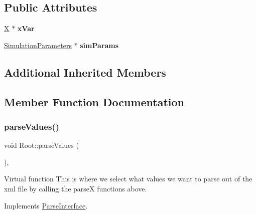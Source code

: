 \subsection*{Public Attributes}
\begin{DoxyCompactItemize}
\item 
\mbox{\label{classRoot_aa61fa8f78e32674c07681894d1dd3a12}} 
\hyperlink{classX}{X} $\ast$ {\bfseries x\+Var}
\item 
\mbox{\label{classRoot_a9234ed2debae0233778343218393f9b2}} 
\hyperlink{classSimulationParameters}{Simulation\+Parameters} $\ast$ {\bfseries sim\+Params}
\end{DoxyCompactItemize}
\subsection*{Additional Inherited Members}


\subsection{Member Function Documentation}
\mbox{\label{classRoot_ade0eb65da55fa8c045a76bcf1fb16009}} 
\subsubsection{\texorpdfstring{parse\+Values()}{parseValues()}\hspace{0.1cm}{\footnotesize\ttfamily [1/2]}}
{\footnotesize\ttfamily void Root\+::parse\+Values (\begin{DoxyParamCaption}{ }\end{DoxyParamCaption})\hspace{0.3cm}{\ttfamily [inline]}, {\ttfamily [virtual]}}

Virtual function This is where we select what values we want to parse out of the xml file by calling the parseX functions above. 

Implements \hyperlink{classParseInterface_afca32108192ba0997c9e5a78189b0cbc}{Parse\+Interface}.

\mbox{\label{classRoot_ade0eb65da55fa8c045a76bcf1fb16009}} 
